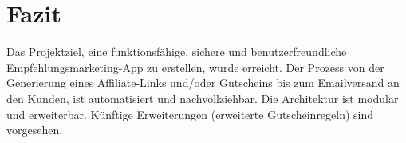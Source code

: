 \newpage
\section{Fazit}
Das Projektziel, eine funktionsfähige, sichere und benutzerfreundliche Empfehlungsmarketing-App zu erstellen, wurde erreicht. Der Prozess von der Generierung eines Affiliate-Links und/oder Gutscheins bis zum Emailversand an den Kunden, ist automatisiert und nachvollziehbar. Die Architektur ist modular und erweiterbar. Künftige Erweiterungen (\zB erweiterte Gutscheinregeln) sind vorgesehen.
\newpage
